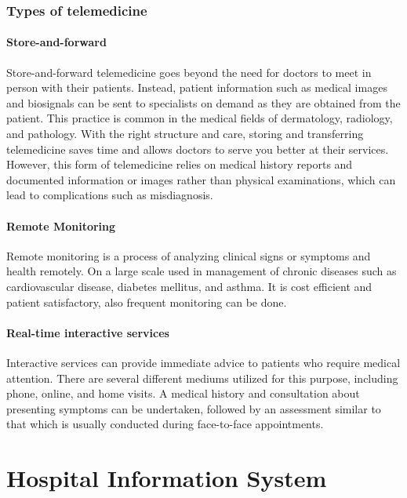 \documentclass[11pt,a4paper,twoside]{article}
\begin{document}
\section{Types of telemedicine}
\subsection{Store-and-forward}
Store-and-forward telemedicine goes beyond the need for doctors to meet in person with their patients. Instead, patient information such as medical images and biosignals can be sent to specialists on demand as they are obtained from the patient. This practice is common in the medical fields of dermatology, radiology, and pathology. With the right structure and care, storing and transferring telemedicine saves time and allows doctors to serve you better at their services. However, this form of telemedicine relies on medical history reports and documented information or images rather than physical examinations, which can lead to complications such as misdiagnosis.
\subsection{Remote Monitoring}
Remote monitoring is a process of analyzing clinical signs or symptoms and health remotely. On a large scale used in management of chronic diseases such as cardiovascular disease, diabetes mellitus, and asthma. It is cost efficient and patient satisfactory, also frequent monitoring can be done.
\subsection{Real-time interactive services}
Interactive services can provide immediate advice to patients who require medical attention. There are several different mediums utilized for this purpose, including phone, online, and home visits. A medical history and consultation about presenting symptoms can be undertaken, followed by an assessment similar to that which is usually conducted during face-to-face appointments.
\newpage
\part{Hospital Information System}
\end{document}
